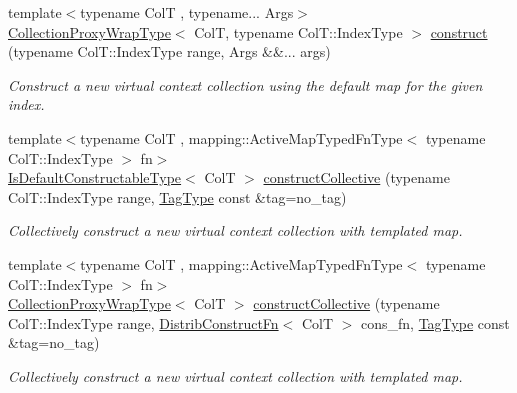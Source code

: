 \begin{DoxyCompactItemize}
{\footnotesize template$<$typename ColT , typename... Args$>$ }\\\hyperlink{structvt_1_1vrt_1_1collection_1_1_collection_manager_a56458ed7f9bb22b631b9b3a745f42f94}{Collection\+Proxy\+Wrap\+Type}$<$ ColT, typename Col\+T\+::\+Index\+Type $>$ \hyperlink{structvt_1_1vrt_1_1collection_1_1_collection_manager_a9049432725068d7ec7f664f7a8759a69}{construct} (typename Col\+T\+::\+Index\+Type range, Args \&\&... args)
\begin{DoxyCompactList}\small\item\em Construct a new virtual context collection using the default map for the given index. \end{DoxyCompactList}\item 
{\footnotesize template$<$typename ColT , mapping\+::\+Active\+Map\+Typed\+Fn\+Type$<$ typename Col\+T\+::\+Index\+Type $>$ fn$>$ }\\\hyperlink{structvt_1_1vrt_1_1collection_1_1_collection_manager_af8091fcb8218dad155ea028c9b5d283f}{Is\+Default\+Constructable\+Type}$<$ ColT $>$ \hyperlink{structvt_1_1vrt_1_1collection_1_1_collection_manager_aa2531212565b2c6f85fa3b55d278bbba}{construct\+Collective} (typename Col\+T\+::\+Index\+Type range, \hyperlink{namespacevt_a84ab281dae04a52a4b243d6bf62d0e52}{Tag\+Type} const \&tag=no\+\_\+tag)
\begin{DoxyCompactList}\small\item\em Collectively construct a new virtual context collection with templated map. \end{DoxyCompactList}\item 
{\footnotesize template$<$typename ColT , mapping\+::\+Active\+Map\+Typed\+Fn\+Type$<$ typename Col\+T\+::\+Index\+Type $>$ fn$>$ }\\\hyperlink{structvt_1_1vrt_1_1collection_1_1_collection_manager_a56458ed7f9bb22b631b9b3a745f42f94}{Collection\+Proxy\+Wrap\+Type}$<$ ColT $>$ \hyperlink{structvt_1_1vrt_1_1collection_1_1_collection_manager_a619d6e576f0d108e442b16ca4f68f1f3}{construct\+Collective} (typename Col\+T\+::\+Index\+Type range, \hyperlink{structvt_1_1vrt_1_1collection_1_1_collection_manager_a7503830bc133013d542856fa39834dcc}{Distrib\+Construct\+Fn}$<$ ColT $>$ cons\+\_\+fn, \hyperlink{namespacevt_a84ab281dae04a52a4b243d6bf62d0e52}{Tag\+Type} const \&tag=no\+\_\+tag)
\begin{DoxyCompactList}\small\item\em Collectively construct a new virtual context collection with templated map. \end{DoxyCompactList}\item 

\end{DoxyCompactItemize}
